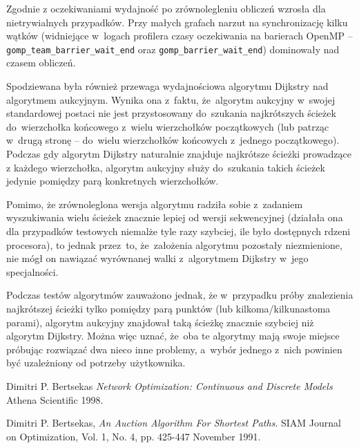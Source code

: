 \documentclass {article}
\begin{document}
Zgodnie z oczekiwaniami wydajność po zrównolegleniu obliczeń wzrosła dla nietrywialnych przypadków. Przy małych grafach narzut na synchronizację kilku wątków (widniejące w~logach profilera czasy oczekiwania na barierach OpenMP -- \verb|gomp_team_barrier_wait_end| oraz \verb|gomp_barrier_wait_end|) dominowały nad czasem obliczeń.

Spodziewana była również przewaga wydajnościowa algorytmu Dijkstry nad algorytmem aukcyjnym. Wynika ona z~faktu, że~algorytm aukcyjny w~swojej standardowej postaci nie jest przystosowany do~szukania najkrótszych ścieżek do~wierzchołka końcowego z~wielu wierzchołków początkowych (lub patrząc w~drugą stronę -- do~wielu wierzchołków końcowych z~jednego początkowego). Podczas gdy algorytm Dijkstry naturalnie znajduje najkrótsze ścieżki prowadzące z każdego wierzchołka, algorytm aukcyjny służy do~szukania takich ścieżek jedynie pomiędzy parą konkretnych wierzchołków.

Pomimo, że zrównoleglona wersja algorytmu radziła sobie z~zadaniem wyszukiwania wielu ścieżek znacznie lepiej od wersji sekwencyjnej (działała ona dla przypadków testowych niemalże tyle razy szybciej, ile było dostępnych rdzeni procesora), to jednak przez~to, że~założenia algorytmu pozostały niezmienione, nie mógł on nawiązać wyrównanej walki z~algorytmem Dijkstry w~jego specjalności.

Podczas testów algorytmów zauważono jednak, że w~przypadku próby znalezienia najkrótszej ścieżki tylko pomiędzy parą punktów (lub kilkoma/kilkunastoma parami), algorytm aukcyjny znajdował taką ścieżkę znacznie szybciej niż algorytm Dijkstry. Można więc uznać, że~oba te algorytmy mają swoje miejsce próbując rozwiązać dwa nieco inne problemy, a~wybór jednego z~nich powinien być uzależniony od potrzeby użytkownika.


\begin{thebibliography}{9}

        Dimitri P. Bertsekas
        \emph{Network Optimization: Continuous and Discrete Models}
        Athena Scientific
        1998.

        Dimitri P. Bertsekas,
        \emph{An Auction Algorithm For Shortest Paths}.
        SIAM Journal on Optimization,
        Vol. 1, No. 4, pp. 425-447
        November 1991.
      
\end{thebibliography}
\end{document}
